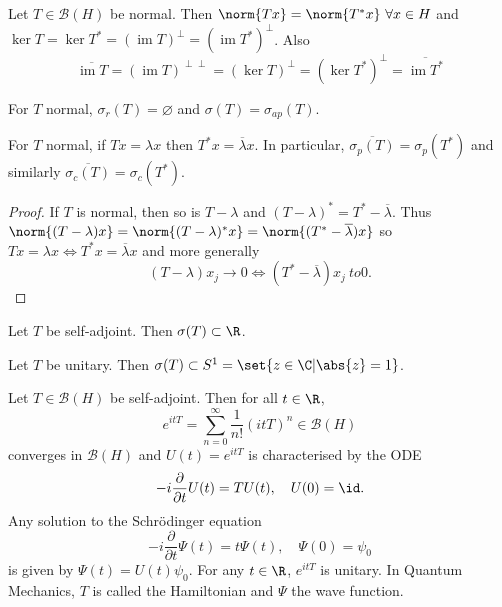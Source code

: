 \documentclass{article}
\renewcommand{\emptyset}{\varnothing}
\DeclareMathOperator{\im}{im}
\begin{document}

\begin{ex}
    Let $T \in \mathcal{B}(H)$ be normal.
    Then $\norm{Tx} = \norm{T^* x} \ \forall x \in H$ and $\ker T = \ker T^* = (\im T)^\perp = (\im T^*)^\perp$.
    Also
    \begin{equation*}
        \overline{\im T} = (\im T)^{\perp \perp} = (\ker T)^\perp = (\ker T^*)^\perp = \overline{\im T^*}
    \end{equation*}
\end{ex}

\begin{cor}
    For $T$ normal, $\sigma_r(T) = \emptyset$ and $\sigma(T) = \sigma_{ap}(T)$.
\end{cor}

\begin{cor}
    For $T$ normal, if $Tx = \lambda x$ then $T^* x = \overline{\lambda} x$.
    In particular, $\overline{\sigma_p(T)} = \sigma_p(T^*)$ and similarly $\overline{\sigma_c(T)} = \sigma_c(T^*)$.
\end{cor}

\begin{proof}
    If $T$ is normal, then so is $T - \lambda$ and $(T-\lambda)^* = T^* - \overline{\lambda}$.
    Thus $\norm{(T-\lambda)x} = \norm{(T-\lambda)^* x} = \norm{(T^* - \overline{\lambda}) x}$ so $Tx = \lambda x \iff T^* x = \overline{\lambda} x$ and more generally
    \begin{equation*}
        (T - \lambda) x_j \to 0 \iff (T^* - \overline{\lambda}) x_j \ to 0.
    \end{equation*}
\end{proof}

\begin{cor}
    Let $T$ be self-adjoint. Then $\sigma(T) \subset \R$.
\end{cor}

\begin{ex}
    Let $T$ be unitary. Then $\sigma(T) \subset S^1 = \set{z \in \C | \abs{z} = 1}$.
\end{ex}

\begin{eg}
    Let $T \in \mathcal{B}(H)$ be self-adjoint. Then for all $t \in \R$,
    \begin{equation*}
        e^{itT} = \sum_{n=0}^\infty \frac{1}{n!} (itT)^n \in \mathcal{B}(H)
    \end{equation*}
    converges in $\mathcal{B}(H)$ and $U(t) = e^{itT}$ is characterised by the ODE
    \begin{equation*}
        -i \frac{\partial}{\partial t} U(t) = T U(t), \quad U(0) = \id.
    \end{equation*}
    Any solution to the Schr\"odinger equation
    \begin{equation*}
        -i \frac{\partial}{\partial t} \Psi(t) = t \Psi(t), \quad \Psi(0) = \psi_0
    \end{equation*}
    is given by $\Psi(t) = U(t) \psi_0$. For any $t \in \R$, $e^{itT}$ is unitary.
    In Quantum Mechanics, $T$ is called the Hamiltonian and $\Psi$ the wave function.
\end{eg}
\end{document}
